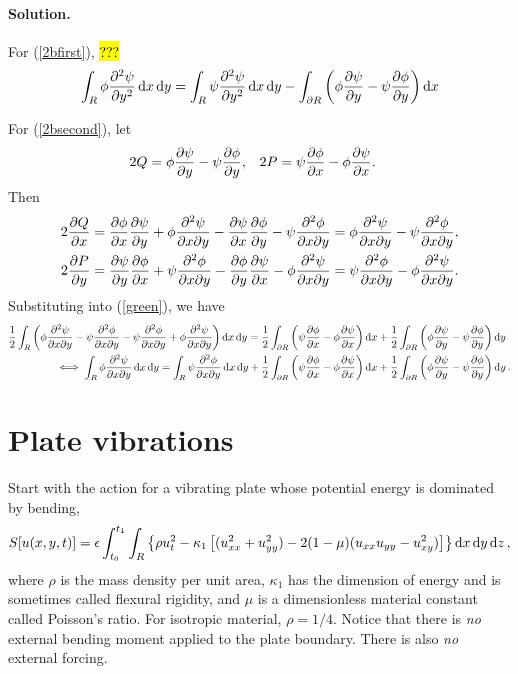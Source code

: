 \documentclass[11pt]{article}
\newcommand{\refeq}[1]{(\ref{#1})}
\newcommand{\beq}{\begin{equation*}}
\newcommand{\eeq}{\end{equation*}}
\newcommand{\beqn}{\begin{equation}}
\newcommand{\eeqn}{\end{equation}}
\newenvironment{statement}
{
    \color{darkgray}
    \ignorespaces
}
{
}
\newenvironment{solution}
{
    \paragraph{Solution.}
    \ignorespaces
}
{
}
\begin{document}
\begin{solution}
	For \refeq{2bfirst}, \hl{???}
	\beq
		\intr \phi \pdv[2]{\psi}{y} \dd{x} \dd{y} = \intr \psi \pdv[2]{\psi}{y} \dd{x} \dd{y} - \intdr \left( \phi \pdv{\psi}{y} - \psi \pdv{\phi}{y} \right) \dd{x}
	\eeq
	
	For \refeq{2bsecond}, let
	\begin{align*}
		2Q &= \phi \pdv{\psi}{y} - \psi \pdv{\phi}{y}, &
		2P &= \psi \pdv{\phi}{x} - \phi \pdv{\psi}{x}.
	\end{align*}
	Then
	\begin{align*}
		2 \pdv{Q}{x} &= \pdv{\phi}{x} \pdv{\psi}{y} + \phi \pdv{\psi}{x}{y} - \pdv{\psi}{x} \pdv{\phi}{y} - \psi \pdv{\phi}{x}{y} = \phi \pdv{\psi}{x}{y} - \psi \pdv{\phi}{x}{y}, \\
		2 \pdv{P}{y} &= \pdv{\psi}{y} \pdv{\phi}{x} + \psi \pdv{\phi}{x}{y} - \pdv{\phi}{y} \pdv{\psi}{x} - \phi \pdv{\psi}{x}{y} = \psi \pdv{\phi}{x}{y} - \phi \pdv{\psi}{x}{y}.
	\end{align*}
	Substituting into \refeq{green}, we have
	\begin{align*}
		\frac{1}{2} \int_R \left( \phi \pdv{\psi}{x}{y} - \psi \pdv{\phi}{x}{y} - \psi \pdv{\phi}{x}{y} + \phi \pdv{\psi}{x}{y} \right) \dd{x} \dd{y} = \frac{1}{2} \int_{\partial R} \left( \psi \pdv{\phi}{x} - \phi \pdv{\psi}{x} \right) \dd{x} + \frac{1}{2} \int_{\partial R} \left( \phi \pdv{\psi}{y} - \psi \pdv{\phi}{y} \right) &\dd{y} \\
		\iff \int_R \phi \pdv{\psi}{x}{y} \dd{x} \dd{y} = \int_R \psi \pdv{\phi}{x}{y} \dd{x} \dd{y} + \frac{1}{2} \int_{\partial R} \left( \psi \pdv{\phi}{x} - \phi \pdv{\psi}{x} \right) \dd{x} + \frac{1}{2} \int_{\partial R} \left( \phi \pdv{\psi}{y} - \psi \pdv{\phi}{y} \right) &\dd{y}.
	\end{align*}
\end{solution}


\newcommand{\dS}{\delta S}
\newcommand{\eps}{\epsilon}
\newcommand{\intt}{\int_{t_0}^{t_1}}
\newcommand{\ut}{u_t}
\newcommand{\utt}{u_{tt}}
\newcommand{\kaq}{\kappa_1}
\newcommand{\lapw}{\nabla^4}
\newcommand{\Pu}{P(u)}
\newcommand{\Mu}{M(u)}
\newcommand{\dlt}{\dd{l} \dd{t}}
\newcommand{\uo}{u_0}

\section{Plate vibrations}

\begin{statement}
	Start with the action for a vibrating plate whose potential energy is dominated by bending,
	\beqn \label{action3}
		S[u(x, y, t)] = \eps \intt \intr \left\{ \rho \ut^2 - \kaq \left[ (\uxx^2 + \uyy^2) - 2 (1 - \mu) (\uxx \uyy - \uxy^2) \right] \right\} \dr,
	\eeqn
	where $\rho$ is the mass density per unit area, $\kaq$ has the dimension of energy and is sometimes called flexural rigidity, and $\mu$ is a dimensionless material constant called Poisson's ratio.  For isotropic material, $\rho = 1/4$.  Notice that there is \emph{no} external bending moment applied to the plate boundary.  There is also \emph{no} external forcing.
\end{statement}
\end{document}
